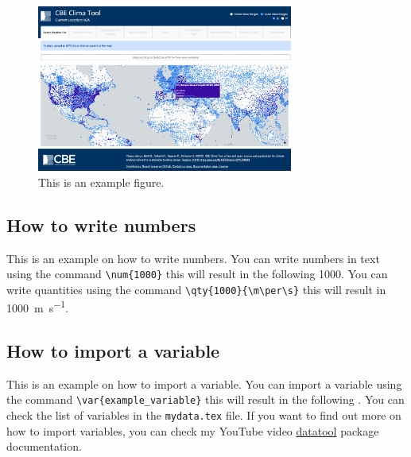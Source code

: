 \begin{figure}[htb!]
    \centering
    \includegraphics[width=0.75\textwidth]{figures/example_clima}
    \caption{This is an example figure.}
    \label{fig:example}
\end{figure}

\subsection{How to write numbers}\label{subsec:how-to-write-numbers}
This is an example on how to write numbers.
You can write numbers in text using the command \verb!\num{1000}! this will result in the following \num{1000}.
You can write quantities using the command \verb!\qty{1000}{\m\per\s}! this will result in \qty{1000}{\m\per\s}.

\subsection{How to import a variable}\label{subsec:how-to-import-a-variable}
This is an example on how to import a variable.
You can import a variable using the command \verb!\var{example_variable}! this will result in the following .
You can check the list of variables in the \texttt{mydata.tex} file.
If you want to find out more on how to import variables, you can check my YouTube video \href{https://ctan.org/pkg/datatool}{datatool} package documentation.